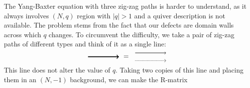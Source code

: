The Yang-Baxter equation with three zig-zag paths is harder to understand,
as it always involves $( N,q )$ region with $|q|>1$
and a quiver description is not available. The problem stems from
the fact that our defects are domain walls across which $q$ changes.
To circumvent the difficulty, we take a pair of zig-zag paths of different
types and think of it as a single line:
\begin{equation}
    \begin{tikzpicture}[scale=1, baseline=(x.base)]    \node (x) at (0,0) {\vphantom{x}};

        \draw[very thick, ->] (0,0) -- (1.6,0);

    \end{tikzpicture}
  \ = \
    \begin{tikzpicture}[scale=1, baseline=(x.base)]    \node (x) at (0,0) {\vphantom{x}};

        \draw[semithick, ->, yshift=0.2cm] (0,0) -- (1.6,0);
        \draw[semithick, densely dotted, ->, yshift=-0.2cm] (0,0) -- (1.6,0);

    \end{tikzpicture}
\end{equation}
This line does not alter the value of $q$. Taking two copies of
this line and placing them in an $( N,-1 )$ background,
we can make the R-matrix
